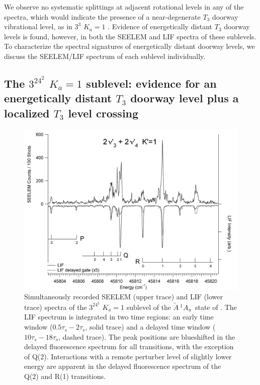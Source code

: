 \documentclass[12pt]{mitthesis}
\newcommand{\astate}{$
  \tilde{A} \: ^1\!A_u
  $}
\newcommand{\Ka}[1]{$K_a\!\!=\!#1$}
\begin{document}
We observe no systematic splittings at adjacent rotational levels in
any of the spectra, which would indicate the presence of a
near-degenerate $T_3$ doorway vibrational level, as in $3^3$ \Ka{1}
\cite{mishra04}.  Evidence of energetically distant $T_3$ doorway
levels is found, however, in both the SEELEM and LIF spectra of these
sublevels.  To characterize the spectral signatures of energetically
distant doorway levels, we discuss the SEELEM/LIF spectrum of each
sublevel individually.


\subsection{The $3^24^2$ \Ka{1} sublevel: evidence for an
  energetically distant $T_3$ doorway level plus a localized $T_3$
  level crossing}




\begin{figure}
  \caption{Simultaneously recorded SEELEM (upper trace) and LIF (lower
    trace) spectra of the $3^24^2$ \Ka{1} sublevel of the \astate\
    state of .  The LIF spectrum is integrated in two time
    regions: an early time window ($0.5\tau_s-2\tau_s$, solid trace)
    and a delayed time window ($10\tau_s-18\tau_s$, dashed trace).
    The peak positions are blueshifted in the delayed fluorescence
    spectrum for all transitions, with the exception of Q(2).
    Interactions with a remote perturber level of slightly lower
    energy are apparent in the delayed fluorescence spectrum of the
    Q(2) and R(1) transitions.}
  \label{fig:spectrum-32b2}
  \centering
  \includegraphics[width=7in,angle=90]{acetylene-32b2-p3r4.png}
\end{figure}
\end{document}
